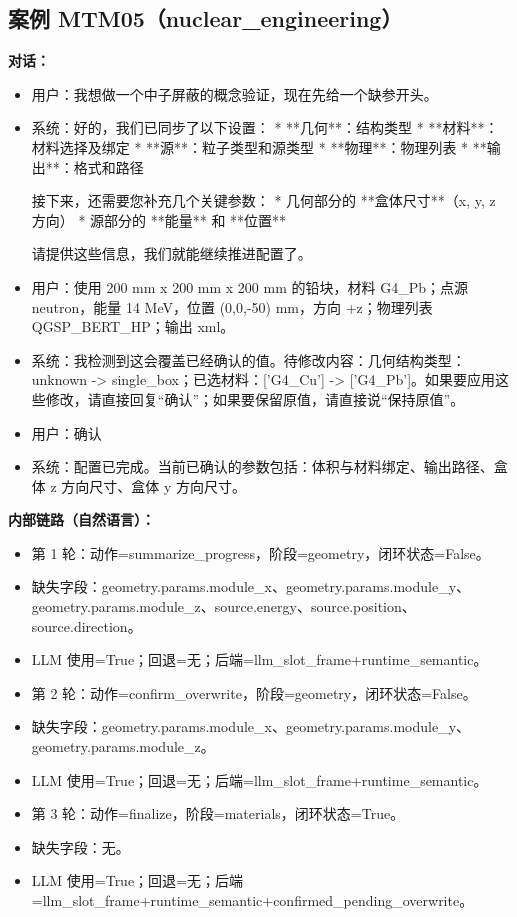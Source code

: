 \documentclass[11pt]{ctexart}
\begin{document}
\subsection{案例 MTM05（nuclear\_engineering）}
\textbf{对话：}
\begin{itemize}
\item 用户：我想做一个中子屏蔽的概念验证，现在先给一个缺参开头。
\item 系统：好的，我们已同步了以下设置：
*   **几何**：结构类型
*   **材料**：材料选择及绑定
*   **源**：粒子类型和源类型
*   **物理**：物理列表
*   **输出**：格式和路径

接下来，还需要您补充几个关键参数：
*   几何部分的 **盒体尺寸**（x, y, z 方向）
*   源部分的 **能量** 和 **位置**

请提供这些信息，我们就能继续推进配置了。
\item 用户：使用 200 mm x 200 mm x 200 mm 的铅块，材料 G4\_Pb；点源 neutron，能量 14 MeV，位置 (0,0,-50) mm，方向 +z；物理列表 QGSP\_BERT\_HP；输出 xml。
\item 系统：我检测到这会覆盖已经确认的值。待修改内容：几何结构类型：unknown -> single\_box；已选材料：['G4\_Cu'] -> ['G4\_Pb']。如果要应用这些修改，请直接回复“确认”；如果要保留原值，请直接说“保持原值”。
\item 用户：确认
\item 系统：配置已完成。当前已确认的参数包括：体积与材料绑定、输出路径、盒体 z 方向尺寸、盒体 y 方向尺寸。
\end{itemize}
\textbf{内部链路（自然语言）：}
\begin{itemize}
\item 第 1 轮：动作=summarize\_progress，阶段=geometry，闭环状态=False。
\item 缺失字段：geometry.params.module\_x、geometry.params.module\_y、geometry.params.module\_z、source.energy、source.position、source.direction。
\item LLM 使用=True；回退=无；后端=llm\_slot\_frame+runtime\_semantic。
\item 第 2 轮：动作=confirm\_overwrite，阶段=geometry，闭环状态=False。
\item 缺失字段：geometry.params.module\_x、geometry.params.module\_y、geometry.params.module\_z。
\item LLM 使用=True；回退=无；后端=llm\_slot\_frame+runtime\_semantic。
\item 第 3 轮：动作=finalize，阶段=materials，闭环状态=True。
\item 缺失字段：无。
\item LLM 使用=True；回退=无；后端=llm\_slot\_frame+runtime\_semantic+confirmed\_pending\_overwrite。
\end{itemize}
\end{document}
